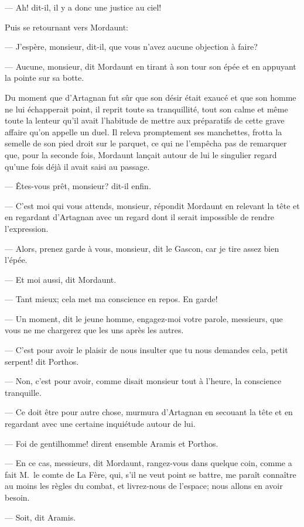 — Ah! dit-il, il y a donc une justice au ciel!

Puis se retournant vers Mordaunt:

— J'espère, monsieur, dit-il, que vous n'avez aucune objection à faire?

— Aucune, monsieur, dit Mordaunt en tirant à son tour son épée et en appuyant la pointe sur sa botte.

Du moment que d'Artagnan fut sûr que son désir était exaucé et que son homme ne lui échapperait point, il reprit toute sa tranquillité, tout son calme et même toute la lenteur qu'il avait l'habitude de mettre aux préparatifs de cette grave affaire qu'on appelle un duel. Il releva promptement ses manchettes, frotta la semelle de son pied droit sur le parquet, ce qui ne l'empêcha pas de remarquer que, pour la seconde fois, Mordaunt lançait autour de lui le singulier regard qu'une fois déjà il avait saisi au passage.

— Êtes-vous prêt, monsieur? dit-il enfin.

— C'est moi qui vous attends, monsieur, répondit Mordaunt en relevant la tête et en regardant d'Artagnan avec un regard dont il serait impossible de rendre l'expression.

— Alors, prenez garde à vous, monsieur, dit le Gascon, car je tire assez bien l'épée.

— Et moi aussi, dit Mordaunt.

— Tant mieux; cela met ma conscience en repos. En garde!

— Un moment, dit le jeune homme, engagez-moi votre parole, messieurs, que vous ne me chargerez que les uns après les autres.

— C'est pour avoir le plaisir de nous insulter que tu nous demandes cela, petit serpent! dit Porthos.

— Non, c'est pour avoir, comme disait monsieur tout à l'heure, la conscience tranquille.

— Ce doit être pour autre chose, murmura d'Artagnan en secouant la tête et en regardant avec une certaine inquiétude autour de lui.

— Foi de gentilhomme! dirent ensemble Aramis et Porthos.

— En ce cas, messieurs, dit Mordaunt, rangez-vous dans quelque coin, comme a fait M.~le comte de La Fère, qui, s'il ne veut point se battre, me paraît connaître au moins les règles du combat, et livrez-nous de l'espace; nous allons en avoir besoin.

— Soit, dit Aramis.

